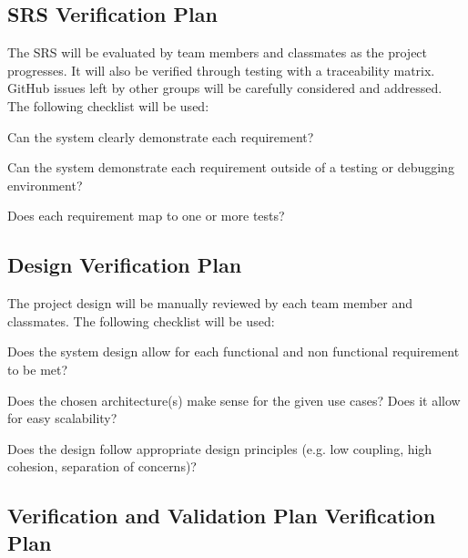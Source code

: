 \documentclass[12pt, titlepage]{article}
\begin{document}
	\subsection{SRS Verification Plan}

	The SRS will be evaluated by team members and classmates as the project progresses. It will also be verified through testing with a traceability matrix.
	GitHub issues left by other groups will be carefully considered and addressed.
	The following checklist will be used:
	\begin{todolist}
		\item Can the system clearly demonstrate each requirement?
		\item Can the system demonstrate each requirement outside of a testing or debugging environment?
		\item Does each requirement map to one or more tests?
	\end{todolist}
	
	\subsection{Design Verification Plan}

	The project design will be manually reviewed by each team member and classmates. The following checklist will be used:
	\begin{todolist}
		\item Does the system design allow for each functional and non functional requirement to be met?
		\item Does the chosen architecture(s) make sense for the given use cases? Does it allow for easy scalability?
		\item Does the design follow appropriate design principles (e.g. low coupling, high cohesion, separation of concerns)?
	\end{todolist}
	
	\subsection{Verification and Validation Plan Verification Plan}
\end{document}
